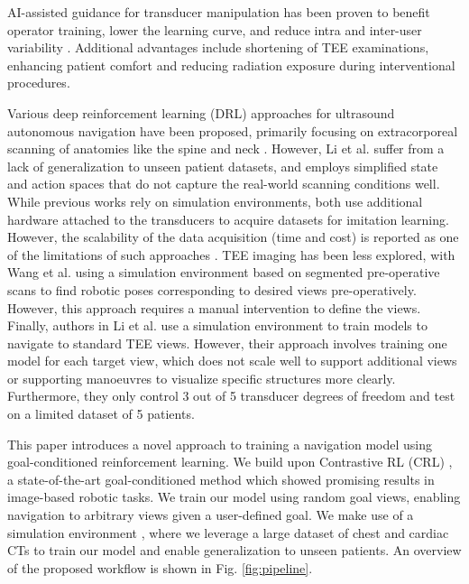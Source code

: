 AI-assisted guidance for transducer manipulation has been proven to benefit operator training, lower the learning curve, and reduce intra and inter-user variability \cite{Narang2021UtilityOA,sabo2023}. Additional advantages include shortening of TEE examinations, enhancing patient comfort and reducing radiation exposure during interventional procedures.

Various deep reinforcement learning (DRL) approaches for ultrasound autonomous navigation have been proposed, primarily focusing on extracorporeal scanning of anatomies like the spine \cite{Li2021AutonomousNO,Hase2020UltrasoundGuidedRN} and neck \cite{Bi2022VesNetRLSR}. However, Li et al. \cite{Li2021AutonomousNO} suffer from a lack of generalization to unseen patient datasets, and \cite{Hase2020UltrasoundGuidedRN} employs simplified state and action spaces that do not capture the real-world scanning conditions well. While previous works rely on simulation environments, both \cite{Droste2020AutomaticPM,milletari_straight_2019} use additional hardware attached to the transducers to acquire datasets for imitation learning. However, the scalability of the data acquisition (time and cost) is reported as one of the limitations of such approaches \cite{milletari_straight_2019}. TEE imaging has been less explored, with Wang et al. \cite{Wang2021RoboticIU} using a simulation environment based on segmented pre-operative scans to find robotic poses corresponding to desired views pre-operatively. However, this approach requires a manual intervention to define the views. Finally, authors in Li et al. \cite{Li2023RLTEEAP} use a simulation environment to train models to navigate to standard TEE views. However, their approach involves training one model for each target view, which does not scale well to support additional views or supporting manoeuvres to visualize specific structures more clearly. Furthermore, they only control 3 out of 5 transducer degrees of freedom and test on a limited dataset of 5 patients.

This paper introduces a novel approach to training a navigation model using goal-conditioned reinforcement learning. We build upon Contrastive RL (CRL) \cite{Eysenbach2022ContrastiveLA}, a state-of-the-art goal-conditioned method which showed promising results in image-based robotic tasks. We train our model using random goal views, enabling navigation to arbitrary views given a user-defined goal. We make use of a simulation environment \cite{amadou2024cardiac}, where we leverage a large dataset of chest and cardiac CTs to train our model and enable generalization to unseen patients. An overview of the proposed workflow is shown in Fig. \ref{fig:pipeline}.

